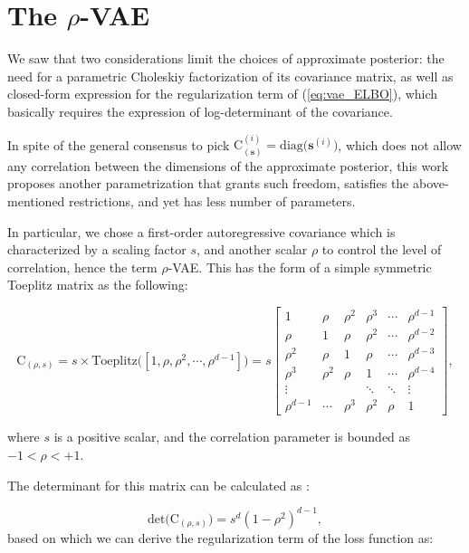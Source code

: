\documentclass{article}
\begin{document}
\section{The $\rho$-VAE}  \label{sec:proposed}
We saw that two considerations limit the choices of approximate posterior: the need for a parametric Choleskiy factorization of its covariance matrix, as well as closed-form expression for the regularization term of (\ref{eq:vae_ELBO}), which basically requires the expression of log-determinant  of the covariance.

In spite of the general consensus to pick $\mathrm{C}_{(\mathbf{s})}^{(i)} = \text{diag}\big( \mathbf{s}^{(i)} \big)$, which does not allow any correlation between the dimensions of the approximate posterior, this work proposes another parametrization that grants such freedom, satisfies the above-mentioned restrictions, and yet has less number of parameters.

In particular, we chose a first-order autoregressive covariance which is characterized by a scaling factor $s$, and another scalar $\rho$ to control the level of correlation, hence the term $\rho$-VAE. This has the form of a simple symmetric Toeplitz matrix as the following:

\begin{equation}  \label{eq:rho_cov}
\mathrm{C}_{(\rho,s)} = s \times  \text{Toeplitz} \Big([1,\rho, \rho^2, \cdots, \rho^{d-1}] \Big)
= s \begin{bmatrix}
    1          & \rho        & \rho^2     & \rho^3       & \cdots   & \rho^{d-1} \\
    \rho       & 1           & \rho       & \rho^2       & \cdots   & \rho^{d-2} \\
    \rho^2     & \rho        & 1          & \rho         & \cdots   & \rho^{d-3} \\
    \rho^3     & \rho^2      & \rho       & 1            & \cdots   & \rho^{d-4} \\
    \vdots     &       &       & \ddots       & \ddots   & \vdots      \\
    \rho^{d-1} & \cdots  & \rho^3 & \rho^2   & \rho   & 1
  \end{bmatrix},
\end{equation}

where $s$ is a positive scalar, and the correlation parameter is bounded as $-1 < \rho  < +1$.

The determinant for this matrix can be calculated as \cite{10.2307/1993228}: 

\begin{equation} \label{eq:rho_det}
\text{det} \big( \mathrm{C}_{(\rho,s)} \big) = s^d (1 - \rho^2)^{d-1},
\end{equation}
based on which we can derive the regularization term of the loss function as:
\end{document}
